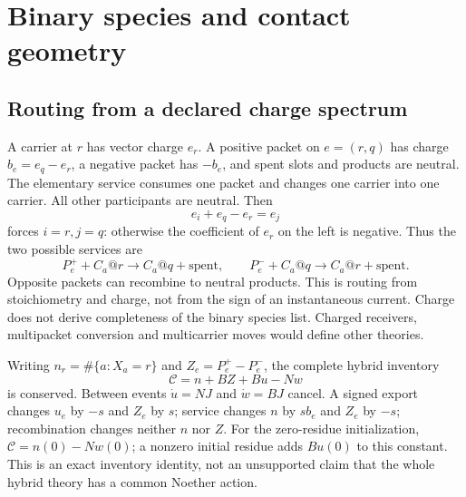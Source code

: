 \documentclass[11pt]{article}
\theoremstyle{definition}\newtheorem{definition}[theorem]{Definition}
\theoremstyle{remark}\newtheorem{remark}[theorem]{Remark}
\begin{document}
\section{Binary species and contact geometry}\label{sec:contacts}
\subsection{Routing from a declared charge spectrum}
A carrier at $r$ has vector charge $e_r$. A positive packet on $e=(r,q)$ has charge $b_e=e_q-e_r$, a negative packet has $-b_e$, and spent slots and products are neutral. The elementary service consumes one packet and changes one carrier into one carrier. All other participants are neutral. Then
\[
 e_i+e_q-e_r=e_j
\]
forces $i=r,j=q$: otherwise the coefficient of $e_r$ on the left is negative. Thus the two possible services are
\begin{equation}
 P_e^++C_a@r\longrightarrow C_a@q+\mathrm{spent},\qquad
 P_e^-+C_a@q\longrightarrow C_a@r+\mathrm{spent}.
 \label{eq:service}
\end{equation}
Opposite packets can recombine to neutral products. This is routing from stoichiometry and charge, not from the sign of an instantaneous current. Charge does not derive completeness of the binary species list. Charged receivers, multipacket conversion and multicarrier moves would define other theories.

Writing $n_r=\#\{a:X_a=r\}$ and $Z_e=P_e^+-P_e^-$, the complete hybrid inventory
\begin{equation}
 \mathcal C=n+BZ+Bu-Nw
 \label{eq:charge}
\end{equation}
is conserved. Between events $\dot u=NJ$ and $\dot w=BJ$ cancel. A signed export changes $u_e$ by $-s$ and $Z_e$ by $s$; service changes $n$ by $sb_e$ and $Z_e$ by $-s$; recombination changes neither $n$ nor $Z$. For the zero-residue initialization, $\mathcal C=n(0)-Nw(0)$; a nonzero initial residue adds $Bu(0)$ to this constant. This is an exact inventory identity, not an unsupported claim that the whole hybrid theory has a common Noether action.
\end{document}

